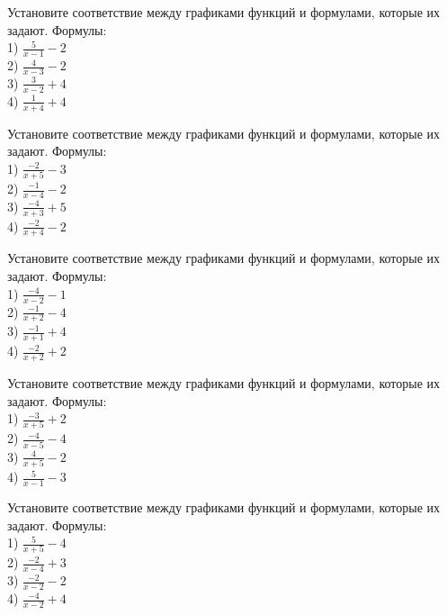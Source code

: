 \documentclass[4apaper]{article}
\begin{document}
\begin{taskBN}{21}
Установите соответствие между графиками функций и формулами, которые их задают. Формулы: \\1) $\frac{5}{x-1}-2$\\2) $\frac{4}{x-3}-2$\\3) $\frac{3}{x-2}+4$\\4) $\frac{1}{x+4}+4$
\end{taskBN}

\begin{taskBN}{22}
Установите соответствие между графиками функций и формулами, которые их задают. Формулы: \\1) $\frac{-2}{x+5}-3$\\2) $\frac{-1}{x-4}-2$\\3) $\frac{-4}{x+3}+5$\\4) $\frac{-2}{x+4}-2$
\end{taskBN}

\begin{taskBN}{23}
Установите соответствие между графиками функций и формулами, которые их задают. Формулы: \\1) $\frac{-4}{x-2}-1$\\2) $\frac{-1}{x+2}-4$\\3) $\frac{-1}{x+1}+4$\\4) $\frac{-2}{x+2}+2$
\end{taskBN}

\begin{taskBN}{24}
Установите соответствие между графиками функций и формулами, которые их задают. Формулы: \\1) $\frac{-3}{x+5}+2$\\2) $\frac{-4}{x-5}-4$\\3) $\frac{4}{x+5}-2$\\4) $\frac{5}{x-1}-3$
\end{taskBN}

\begin{taskBN}{25}
Установите соответствие между графиками функций и формулами, которые их задают. Формулы: \\1) $\frac{5}{x+5}-4$\\2) $\frac{-2}{x-4}+3$\\3) $\frac{-2}{x-2}-2$\\4) $\frac{-4}{x-2}+4$
\end{taskBN}
\end{document}
